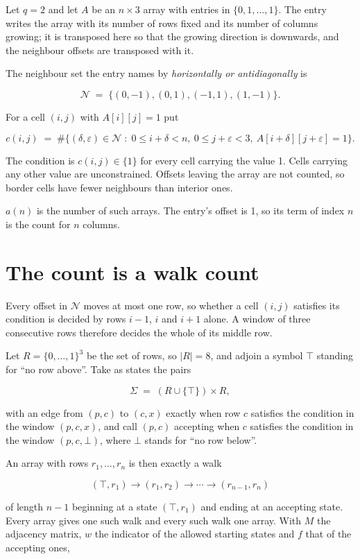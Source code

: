 \documentclass[11pt]{article}
\theoremstyle{definition}
\begin{document}
Let $q = 2$ and let $A$ be an $n \times 3$ array with entries in $\{0,1,\dots,1\}$. The entry writes the array with its number of rows fixed and its number of columns growing; it is transposed here so that the growing direction is downwards, and the neighbour offsets are transposed with it.

The neighbour set the entry names by {\itshape horizontally or antidiagonally} is

\[\mathcal{N} \;=\; \{(0,-1), (0,1), (-1,1), (1,-1)\}.\]

For a cell $(i,j)$ with $A[i][j] = 1$ put

\[c(i,j) \;=\; \#\bigl\{(\delta,\varepsilon)\in\mathcal{N} \;:\; 0\le i+\delta<n,\ 0\le j+\varepsilon<3,\ A[i+\delta][j+\varepsilon] = 1\bigr\}.\]

The condition is $c(i,j) \in \{1\}$ for every cell carrying the value 1. Cells carrying any other value are unconstrained. Offsets leaving the array are not counted, so border cells have fewer neighbours than interior ones.

$a(n)$ is the number of such arrays. The entry's offset is 1, so its term of index $n$ is the count for $n$ columns.

\section{The count is a walk count}

Every offset in $\mathcal{N}$ moves at most one row, so whether a cell $(i,j)$ satisfies its condition is decided by rows $i-1$, $i$ and $i+1$ alone. A window of three consecutive rows therefore decides the whole of its middle row.

Let $R = \{0,\dots,1\}^{3}$ be the set of rows, so $|R| = 8$, and adjoin a symbol $\top$ standing for ``no row above''. Take as states the pairs

\[\Sigma \;=\; (R \cup \{\top\}) \times R,\]

with an edge from $(p,c)$ to $(c,x)$ exactly when row $c$ satisfies the condition in the window $(p,c,x)$, and call $(p,c)$ accepting when $c$ satisfies the condition in the window $(p,c,\bot)$, where $\bot$ stands for ``no row below''.

An array with rows $r_1,\dots,r_n$ is then exactly a walk

\[(\top,r_1) \to (r_1,r_2) \to \cdots \to (r_{n-1},r_n)\]

of length $n-1$ beginning at a state $(\top,r_1)$ and ending at an accepting state. Every array gives one such walk and every such walk one array. With $M$ the adjacency matrix, $w$ the indicator of the allowed starting states and $f$ that of the accepting ones,
\end{document}
